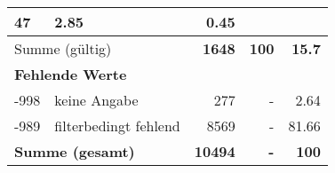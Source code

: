\begin{longtable}{lXrrr}
       \num{47} &
       \num[round-mode=places,round-precision=2]{2.85} &
         \num[round-mode=places,round-precision=2]{0.45} \\
     \midrule
     \multicolumn{2}{l}{Summe (gültig)} &
       \textbf{\num{1648}} &
     \textbf{\num{100}} &
       \textbf{\num[round-mode=places,round-precision=2]{15.7}} \\
     \multicolumn{5}{l}{\textbf{Fehlende Werte}}\\
       -998 &
       keine Angabe &
         \num{277} &
        - &
         \num[round-mode=places,round-precision=2]{2.64} \\
       -989 &
       filterbedingt fehlend &
         \num{8569} &
        - &
         \num[round-mode=places,round-precision=2]{81.66} \\
     \midrule
     \multicolumn{2}{l}{\textbf{Summe (gesamt)}} &
          \textbf{\num{10494}} &
        \textbf{-} &
        \textbf{\num{100}} \\
     \bottomrule
     \end{longtable}
     

